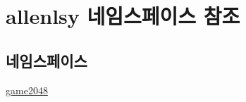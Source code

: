 \hypertarget{namespaceallenlsy}{}\section{allenlsy 네임스페이스 참조}
\label{namespaceallenlsy}
\subsection*{네임스페이스}
\begin{DoxyCompactItemize}
\item 
 \hyperlink{namespaceallenlsy_1_1game2048}{game2048}
\end{DoxyCompactItemize}
